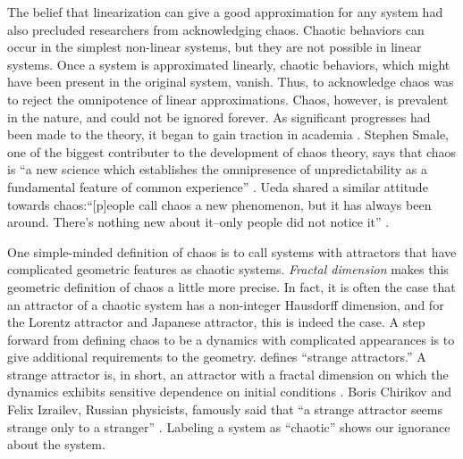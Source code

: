 \documentclass[10pt,twoside]{book}
\begin{document}
The belief that linearization can give a good approximation for any system had also precluded researchers from acknowledging chaos.
Chaotic behaviors can occur in the simplest non-linear systems, but they are not possible in linear systems.
Once a system is approximated linearly, chaotic behaviors, which might have been present in the original system, vanish.
Thus, to acknowledge chaos was to reject the omnipotence of linear approximations.
Chaos, however, is prevalent in the nature, and could not be ignored forever.
As significant progresses had been made to the theory, it began to gain traction in academia \citep{gleick}.
Stephen Smale, one of the biggest contributer to the development of chaos theory, says that chaos is ``a new science which establishes the omnipresence of unpredictability as a fundamental feature of common experience'' \citep[p.16]{ueda-abraham}.
Ueda shared a similar attitude towards chaos:``[p]eople call chaos a new phenomenon, but it has always been around.
There's nothing new about it--only people did not notice it''
\citep[p.27]{ueda-abraham}.

One simple-minded definition of chaos is to call systems with attractors that have complicated geometric features as chaotic systems.
\textit{Fractal dimension} makes this geometric definition of chaos a little more precise.
In fact, it is often the case that an attractor of a chaotic system has a non-integer Hausdorff dimension, and for the Lorentz attractor and Japanese attractor, this is indeed the case.
A step forward from defining chaos to be a dynamics with complicated appearances is to give additional requirements to the geometry.
\citet{ruelle} defines ``strange attractors.'' 
A strange attractor is, in short, an attractor with a fractal dimension on which the dynamics exhibits sensitive dependence on initial conditions \citep[p.11]{ott1994}.
Boris Chirikov and Felix Izrailev, Russian physicists, famously said that ``a strange attractor seems strange only to a stranger'' \citep{lorentzbook}.
Labeling a system as ``chaotic'' shows our ignorance about the system.
\end{document}
